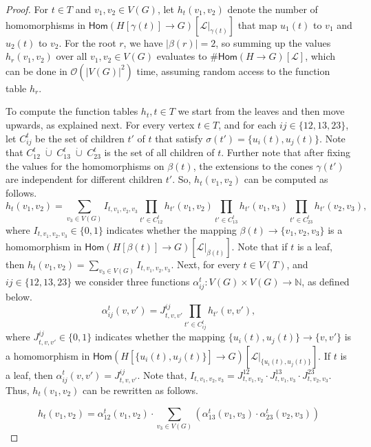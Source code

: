 \documentclass[authorcolumns,numberwithinsect]{no-lipics-v2022}
\newcommand{\homs}[2]{\mathsf{Hom}(#1 \to #2)}
\begin{document}
\begin{proof}
For $t\in T$ and $v_1, v_2 \in V(G)$, let $h_t(v_1,v_2)$ denote the number of homomorphisms in $\homs{H[\gamma(t)]}{G}[\mathcal{L}|_{\gamma(t)}]$ that map $u_1(t)$ to $v_1$ and $u_2(t)$ to $v_2$. For the root $r$, we have $|\beta(r)| = 2$, so summing up the values $h_r(v_1,v_2)$ over all $v_1,v_2 \in V(G)$ evaluates to $\#\homs{H}{G}[\mathcal{L}]$, which can be done in $\mathcal{O}(|V(G)|^2)$ time, assuming random access to the function table $h_r$.

To compute the function tables $h_t, t \in T$ we start from the leaves and then move upwards, as explained next. For every vertex $t \in T$, and for each $ij \in \{12,13,23\}$, let $C^{t}_{ij}$ be the set of children $t'$ of $t$ that satisfy $\sigma(t') = \{u_i(t), u_j(t)\}$. Note that $C^{t}_{12}\;\dot\cup\;C^{t}_{13}\;\dot\cup\;C^{t}_{23}$ is the set of all children of $t$. Further note that after fixing the values for the homomorphisms on $\beta(t)$, the extensions to the cones $\gamma(t')$ are independent for different children $t'$. So, $h_t(v_1, v_2)$ can be computed as follows.
\begin{equation}
    h_{t}(v_1,v_2) = \sum_{v_3\in V(G)}I_{t,v_1,v_2,v_3}\prod_{t'\in C^{t}_{12}}h_{t'}(v_1,v_2)\prod_{t'\in C^{t}_{13}}h_{t'}(v_1,v_3)\prod_{t'\in C^{t}_{23}}h_{t'}(v_2,v_3),
\end{equation}
where $I_{t,v_1,v_2,v_3} \in \{0,1\}$ indicates whether the mapping $\beta(t) \rightarrow \{v_1, v_2, v_3\}$ is a homomorphism in $\homs{H[\beta(t)]}{G}[\mathcal{L}|_{\beta(t)}]$. Note that if $t$ is a leaf, then $h_t(v_1, v_2) = \sum_{v_3 \in V(G)}I_{t, v_1, v_2, v_3}$.
Next, for every $t \in V(T)$, and $ij \in \{12,13,23\}$ we consider three functions $\alpha^t_{ij} : V(G) \times V(G) \rightarrow \mathbb{N}$, as defined below.
\begin{equation}
    \alpha^{t}_{ij}(v,v') = J^{ij}_{t,v,v'}\prod_{t'\in C^{t}_{ij}}h_{t'}(v,v'),
\end{equation}
where $J^{ij}_{t,v,v'} \in \{0,1\}$ indicates whether the mapping $\{u_i(t), u_j(t)\} \rightarrow \{v, v'\}$ is a homomorphism in $\homs{H[\{u_i(t), u_j(t)\}]}{G}[\mathcal{L}|_{\{u_i(t), u_j(t)\}}]$. If $t$ is a leaf, then $\alpha_{ij}^t(v,v') = J^{ij}_{t,v,v'}$. Note that, $I_{t,v_1,v_2,v_3} = J^{12}_{t,v_1,v_2}\cdot J^{13}_{t,v_1,v_3}\cdot J^{23}_{t,v_2,v_3}$. Thus, $h_t(v_1,v_2)$ can be rewritten as follows.

\begin{equation}
    h_{t}(v_1,v_2) = \alpha^{t}_{12}(v_1,v_2)\cdot\sum_{v_3 \in V(G)}(\alpha^{t}_{13}(v_1,v_3)\cdot\alpha^{t}_{23}(v_2,v_3))
\end{equation}


\end{proof}
\end{document}

